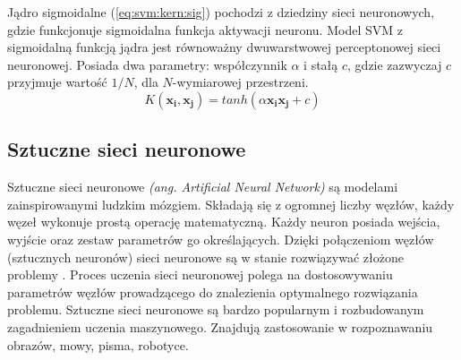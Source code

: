 \documentclass[a4paper,12pt,twoside,openany]{report}
\newcommand{\ang}[1]{\textit{(ang. #1)}}
\newcommand{\Eq}[1]{(\ref{#1})}
\renewcommand{\vec}[1]{\bm{#1}}
\begin{document}
Jądro sigmoidalne \Eq{eq:svm:kern:sig} pochodzi z dziedziny sieci neuronowych,
gdzie funkcjonuje sigmoidalna funkcja aktywacji neuronu. 
Model SVM z sigmoidalną funkcją jądra jest równoważny dwuwarstwowej perceptonowej sieci neuronowej.
Posiada dwa parametry: współczynnik $\alpha$ i stałą $c$, gdzie zazwyczaj $c$ przyjmuje wartość $1/N$,
dla $N$-wymiarowej przestrzeni.
\begin{equation}
	\label{eq:svm:kern:sig}
	K(\vec{x_i}, \vec{x_j}) = tanh( \alpha \vec{x_i}  \vec{x_j} + c)
\end{equation}
\subsection{Sztuczne sieci neuronowe}
Sztuczne sieci neuronowe \ang{Artificial Neural Network} są modelami zainspirowanymi ludzkim mózgiem.
Składają się z ogromnej liczby węzłów, każdy węzeł wykonuje prostą operację matematyczną.
Każdy neuron posiada wejścia, wyjście oraz zestaw parametrów go określających. 
Dzięki połączeniom węzłów (sztucznych neuronów) sieci neuronowe są w stanie rozwiązywać złożone problemy \cite{Gurgen2017}.
Proces uczenia sieci neuronowej polega na dostosowywaniu parametrów węzłów prowadzącego do znalezienia optymalnego rozwiązania problemu.
Sztuczne sieci neuronowe są bardzo popularnym i rozbudowanym zagadnieniem uczenia maszynowego.
Znajdują zastosowanie w rozpoznawaniu obrazów, mowy, pisma, robotyce. 
\end{document}
